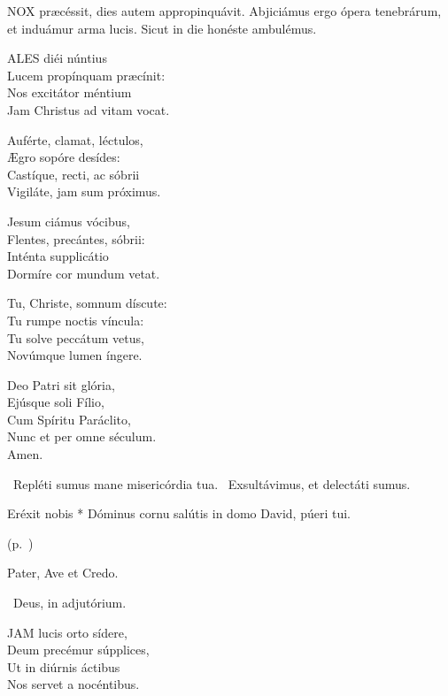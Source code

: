 

\lettrine[lines=2]{N}{OX} præcéssit, dies autem appropinquávit. Abjiciámus ergo ópera tenebrárum, et induámur arma lucis. Sicut in die honéste ambulémus.


\lettrine[lines=2]{A}{LES} diéi núntius\\
Lucem propínquam præcínit:\\
Nos excitátor méntium\\
Jam Christus ad vitam vocat.

Auférte, clamat, léctulos,\\
Ægro sopóre desídes:\\
Castíque, recti, ac sóbrii\\
Vigiláte, jam sum próximus.

Jesum ciámus vócibus,\\
Flentes, precántes, sóbrii:\\
Inténta supplicátio\\
Dormíre cor mundum vetat.

Tu, Christe, somnum díscute:\\
Tu rumpe noctis víncula:\\
Tu solve peccátum vetus,\\
Novúmque lumen íngere.

Deo Patri sit glória,\\
Ejúsque soli Fílio,\\
Cum Spíritu Paráclito,\\
Nunc et per omne séculum.\\
Amen.

\V\ Repléti sumus mane misericórdia tua. \R\ Exsultávimus, et delectáti sumus.

 Eréxit nobis * Dóminus cornu salútis in domo David, púeri tui.

 (p.~\pageref{feria3:precesferiales})


\sectionornament


Pater, Ave et Credo.

\V\ Deus, in adjutórium.


\lettrine[lines=2]{J}{AM} lucis orto sídere,\\
Deum precémur súpplices,\\
Ut in diúrnis áctibus\\
Nos servet a nocéntibus.


